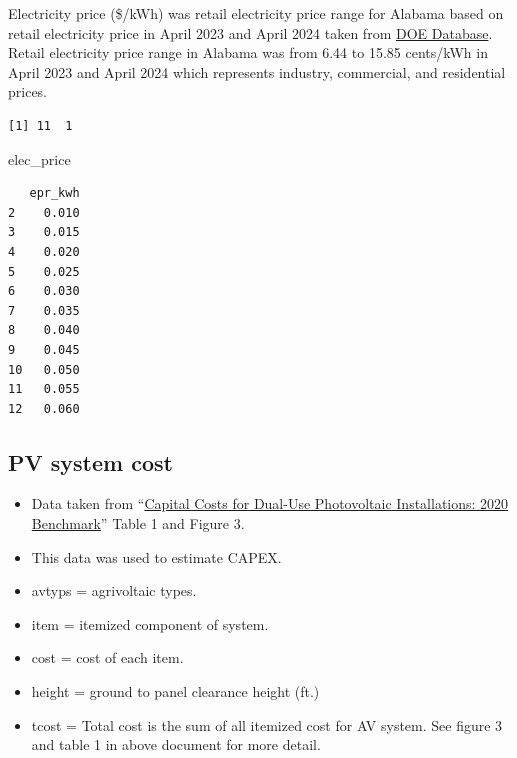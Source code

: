 \documentclass[
  letterpaper,
  DIV=11,
  numbers=noendperiod]{scrartcl}
\newenvironment{Shaded}{\begin{snugshade}}{\end{snugshade}}
\newcommand{\AttributeTok}[1]{\textcolor[rgb]{0.40,0.45,0.13}{#1}}
\newcommand{\FunctionTok}[1]{\textcolor[rgb]{0.28,0.35,0.67}{#1}}
\newcommand{\NormalTok}[1]{\textcolor[rgb]{0.00,0.23,0.31}{#1}}
\newcommand{\OtherTok}[1]{\textcolor[rgb]{0.00,0.23,0.31}{#1}}
\newcommand{\SpecialCharTok}[1]{\textcolor[rgb]{0.37,0.37,0.37}{#1}}
\newcommand{\StringTok}[1]{\textcolor[rgb]{0.13,0.47,0.30}{#1}}
\providecommand{\tightlist}{%
  \setlength{\itemsep}{0pt}\setlength{\parskip}{0pt}}\usepackage{longtable,booktabs,array}
\begin{document}
Electricity price (\$/kWh) was retail electricity price range for
Alabama based on retail electricity price in April 2023 and April 2024
taken from
\href{https://www.eia.gov/electricity/monthly/epm_table_grapher.php?t=epmt_5_6_a}{DOE
Database}. Retail electricity price range in Alabama was from 6.44 to
15.85 cents/kWh in April 2023 and April 2024 which represents industry,
commercial, and residential prices.

\begin{Shaded}
\end{Shaded}

\begin{verbatim}
[1] 11  1
\end{verbatim}

\begin{Shaded}
\begin{Highlighting}[]
\NormalTok{elec\_price}
\end{Highlighting}
\end{Shaded}

\begin{verbatim}
   epr_kwh
2    0.010
3    0.015
4    0.020
5    0.025
6    0.030
7    0.035
8    0.040
9    0.045
10   0.050
11   0.055
12   0.060
\end{verbatim}

\subsection{PV system cost}\label{pv-system-cost}

\begin{itemize}
\tightlist
\item
  Data taken from
  ``\href{https://www.nrel.gov/docs/fy21osti/77811.pdf}{Capital Costs
  for Dual-Use Photovoltaic Installations: 2020 Benchmark}'' Table 1 and
  Figure 3.
\item
  This data was used to estimate CAPEX.
\item
  avtyps = agrivoltaic types.
\item
  item = itemized component of system.
\item
  cost = cost of each item.
\item
  height = ground to panel clearance height (ft.)
\item
  tcost = Total cost is the sum of all itemized cost for AV system. See
  figure 3 and table 1 in above document for more detail.
\end{itemize}
\end{document}
